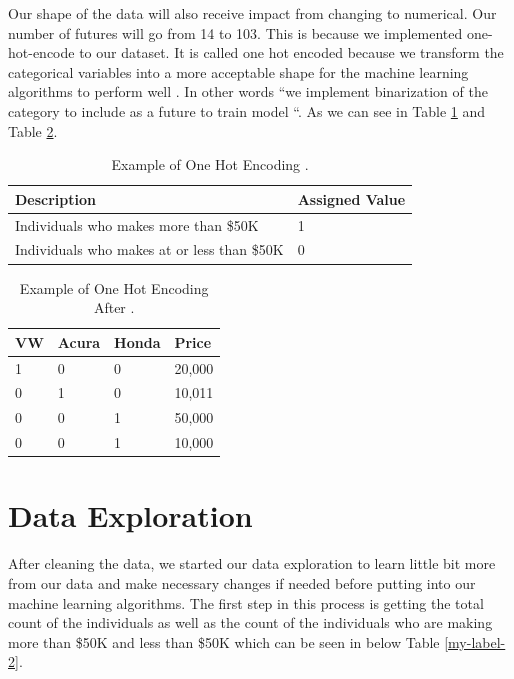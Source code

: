 \documentclass[sigconf]{acmart}
\begin{document}
\par Our shape of the data will also receive impact from changing to numerical. Our number of futures will go from 14 to 103. This is because we implemented one-hot-encode to our dataset. It is called one hot encoded because we transform the categorical variables into a more acceptable shape for the machine learning algorithms to perform well \cite{www-hackernoon}. In other words ``we implement binarization of the category to include as a future to train model \cite{www-hackernoon}``. As we can see in Table \ref{one-hot-before} and Table \ref{one-hot-after}.

\begin{table}[!ht]
\centering
\begin{tabular}{|l|l|}
\hline
Description                                 & Assigned Value \\ \hline
Individuals who makes more than \$50K       & 1              \\ \hline
Individuals who makes at or less than \$50K & 0              \\ \hline
\end{tabular}
\caption{Example of One Hot Encoding \cite{www-hackernoon}.}
\label{one-hot-before}
\end{table}

\begin{table}[!ht]
\centering
\begin{tabular}{|l|l|l|l|}
\hline
VW & Acura & Honda & Price  \\ \hline
1  & 0     & 0     & 20,000 \\ \hline
0  & 1     & 0     & 10,011 \\ \hline
0  & 0     & 1     & 50,000 \\ \hline
0  & 0     & 1     & 10,000 \\ \hline
\end{tabular}
\caption{Example of One Hot Encoding After \cite{www-hackernoon}.}
\label{one-hot-after}
\end{table}


\section{Data Exploration}

After cleaning the data, we started our data exploration to learn little bit more from our data and make necessary changes if needed before putting into our machine learning algorithms. The first step in this process is getting the total count of the individuals as well as the count of the individuals who are making more than \$50K and less than \$50K which can be seen in below Table \ref{my-label-2}.
\end{document}

